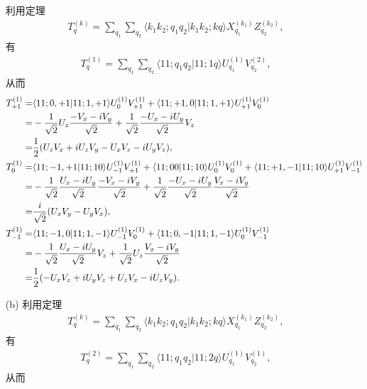 \documentclass{assignment}
\begin{document}
\begin{sol}
\begin{itemize}
        利用定理
        \begin{align}
            T_q^{(k)}=\sum_{q_1}\sum_{q_2}\langle k_1k_2;q_1q_2\vert k_1k_2;kq\rangle X_{q_1}^{(k_1)}Z_{q_2}^{(k_2)},
        \end{align}
        有
        \begin{align}
            T_{q}^{(1)}=\sum_{q_1}\sum_{q_2}\langle 11;q_1q_2\vert 11;1q\rangle U_{q_1}^{(1)}V_{q_2}^{(2)},
        \end{align}
        从而
        \begin{align}
            \notag T_{+1}^{(1)}=&\langle 11;0,+1\vert 11;1,+1\rangle U_{0}^{(1)}V_{+1}^{(1)}+\langle 11;+1,0\vert 11;1,+1\rangle U_{+1}^{(1)}V_{0}^{(1)}\\
            \notag=&-\frac{1}{\sqrt{2}}U_z\frac{-V_x-iV_y}{\sqrt{2}}+\frac{1}{\sqrt{2}}\frac{-U_x-iU_y}{\sqrt{2}}V_z\\
            =&\frac{1}{2}(U_zV_x+iU_zV_y-U_xV_z-iU_yV_z),\\
            \notag T_{0}^{(1)}=&\langle 11;-1,+1\vert 11;10\rangle U_{-1}^{(1)}V_{+1}^{(1)}+\langle 11;00\vert 11;10\rangle U_{0}^{(1)}V_{0}^{(1)}+\langle 11;+1,-1\vert 11;10\rangle U_{+1}^{(1)}V_{-1}^{(1)}\\
            \notag=&-\frac{1}{\sqrt{2}}\frac{U_x-iU_y}{\sqrt{2}}\frac{-V_x-iV_y}{\sqrt{2}}+\frac{1}{\sqrt{2}}\frac{-U_x-iU_y}{\sqrt{2}}\frac{V_x-iV_y}{\sqrt{2}}\\
            =&\frac{i}{\sqrt{2}}(U_xV_y-U_yV_x),\\
            \notag T_{-1}^{(1)}=&\langle 11;-1,0\vert 11;1,-1\rangle U_{-1}^{(1)}V_{0}^{(1)}+\langle 11;0,-1\vert 11;1,-1\rangle U_{0}^{(1)}V_{-1}^{(1)}\\
            \notag=&-\frac{1}{\sqrt{2}}\frac{U_x-iU_y}{\sqrt{2}}V_z+\frac{1}{\sqrt{2}}U_z\frac{V_x-iV_y}{\sqrt{2}}\\
            =&\frac{1}{2}(-U_xV_z+iU_yV_z+U_zV_x-iU_zV_y).
        \end{align}
        \item[(b)] 利用定理
        \begin{align}
            T_q^{(k)}=\sum_{q_1}\sum_{q_2}\langle k_1k_2;q_1q_2\vert k_1k_2;kq\rangle X_{q_1}^{(k_1)}Z_{q_2}^{(k_2)},
        \end{align}
        有
        \begin{align}
            T_q^{(2)}=\sum_{q_1}\sum_{q_2}\langle 11;q_1q_2\vert 11;2q\rangle U_{q_1}^{(1)}V_{q_2}^{(1)},
        \end{align}
        从而

\end{itemize}
\end{sol}
\end{document}
